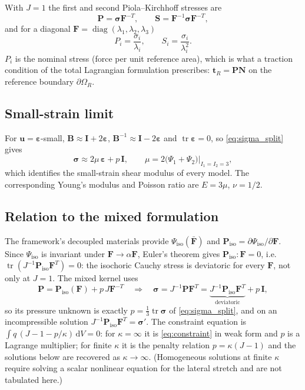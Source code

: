 \documentclass[11pt]{article}
\newcommand{\ud}{\,\mathrm{d}}
\newcommand{\tr}{\operatorname{tr}}
\newcommand{\bu}{\bm{u}}
\newcommand{\bN}{\bm{N}}
\newcommand{\bt}{\bm{t}}
\newcommand{\bsig}{\bm{\sigma}}
\newcommand{\beps}{\bm{\varepsilon}}
\newcommand{\bP}{\bm{P}}
\newcommand{\bS}{\bm{S}}
\newcommand{\bF}{\bm{F}}
\newcommand{\bFb}{\bar{\bm{F}}}
\newcommand{\bB}{\bm{B}}
\newcommand{\bI}{\bm{I}}
\newcommand{\Ione}{I_1}
\newcommand{\Itwo}{I_2}
\newcommand{\Pone}{\Psi_{1}}
\newcommand{\Ptwo}{\Psi_{2}}
\begin{document}
With $J = 1$ the first and second Piola--Kirchhoff stresses are
\begin{equation}
  \bP = \bsig\bF^{-T}, \qquad \bS = \bF^{-1}\bsig\bF^{-T},
\end{equation}
and for a diagonal $\bF = \operatorname{diag}(\lambda_1,\lambda_2,\lambda_3)$
\begin{equation}
  P_i = \frac{\sigma_i}{\lambda_i}, \qquad S_i = \frac{\sigma_i}{\lambda_i^2}.
\end{equation}
$P_i$ is the nominal stress (force per unit reference area), which is what
a traction condition of the total Lagrangian formulation prescribes:
$\bt_R = \bP\bN$ on the reference boundary $\partial\Omega_R$.

\subsection{Small-strain limit}

For $\bu = \beps$-small, $\bB \approx \bI + 2\beps$,
$\bB^{-1} \approx \bI - 2\beps$ and $\tr\beps = 0$, so
\eqref{eq:sigma_split} gives
\begin{equation}
  \bsig \approx 2\mu\,\beps + p\,\bI, \qquad
  \mu = 2\bigl(\Pone + \Ptwo\bigr)\big|_{\Ione = \Itwo = 3},
  \label{eq:mu}
\end{equation}
which identifies the small-strain shear modulus of every model.  The
corresponding Young's modulus and Poisson ratio are $E = 3\mu$, $\nu = 1/2$.

\subsection{Relation to the mixed formulation}
\label{sec:mixed}

The framework's decoupled materials provide $\Psi_{\mathrm{iso}}(\bFb)$
and $\bP_{\mathrm{iso}} = \partial\Psi_{\mathrm{iso}}/\partial\bF$.  Since
$\Psi_{\mathrm{iso}}$ is invariant under $\bF \to \alpha\bF$, Euler's
theorem gives $\bP_{\mathrm{iso}}:\bF = 0$, i.e.\
$\tr(J^{-1}\bP_{\mathrm{iso}}\bF^T) = 0$: the isochoric Cauchy stress is
deviatoric for every $\bF$, not only at $J = 1$.  The mixed kernel uses
\begin{equation}
  \bP = \bP_{\mathrm{iso}}(\bF) + p\,J\bF^{-T}
  \quad\Longrightarrow\quad
  \bsig = J^{-1}\bP\bF^T = \underbrace{J^{-1}\bP_{\mathrm{iso}}\bF^T}_{\text{deviatoric}} + p\,\bI,
\end{equation}
so its pressure unknown is exactly $p = \tfrac13\tr\bsig$ of
\eqref{eq:sigma_split}, and on an incompressible solution
$J^{-1}\bP_{\mathrm{iso}}\bF^T = \bsig'$.  The constraint equation is
$\int q\,(J - 1 - p/\kappa)\ud V = 0$: for $\kappa = \infty$ it is
\eqref{eq:constraint} in weak form and $p$ is a Lagrange multiplier; for
finite $\kappa$ it is the penalty relation $p = \kappa(J - 1)$ and the
solutions below are recovered as $\kappa \to \infty$.  (Homogeneous
solutions at finite $\kappa$ require solving a scalar nonlinear equation
for the lateral stretch and are not tabulated here.)
\end{document}
